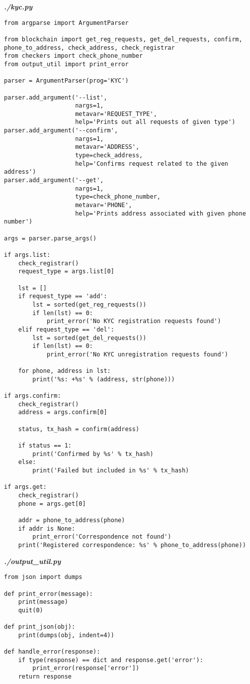 \textit{\textbf{./kyc.py}}
\begin{verbatim}
from argparse import ArgumentParser

from blockchain import get_reg_requests, get_del_requests, confirm, phone_to_address, check_address, check_registrar
from checkers import check_phone_number
from output_util import print_error

parser = ArgumentParser(prog='KYC')

parser.add_argument('--list',
                    nargs=1,
                    metavar='REQUEST_TYPE',
                    help='Prints out all requests of given type')
parser.add_argument('--confirm',
                    nargs=1,
                    metavar='ADDRESS',
                    type=check_address,
                    help='Confirms request related to the given address')
parser.add_argument('--get',
                    nargs=1,
                    type=check_phone_number,
                    metavar='PHONE',
                    help='Prints address associated with given phone number')

args = parser.parse_args()

if args.list:
    check_registrar()
    request_type = args.list[0]

    lst = []
    if request_type == 'add':
        lst = sorted(get_reg_requests())
        if len(lst) == 0:
            print_error('No KYC registration requests found')
    elif request_type == 'del':
        lst = sorted(get_del_requests())
        if len(lst) == 0:
            print_error('No KYC unregistration requests found')

    for phone, address in lst:
        print('%s: +%s' % (address, str(phone)))

if args.confirm:
    check_registrar()
    address = args.confirm[0]

    status, tx_hash = confirm(address)

    if status == 1:
        print('Confirmed by %s' % tx_hash)
    else:
        print('Failed but included in %s' % tx_hash)

if args.get:
    check_registrar()
    phone = args.get[0]

    addr = phone_to_address(phone)
    if addr is None:
        print_error('Correspondence not found')
    print('Registered correspondence: %s' % phone_to_address(phone))
\end{verbatim}

\textit{\textbf{./output\_util.py}}
\begin{verbatim}
from json import dumps

def print_error(message):
    print(message)
    quit(0)

def print_json(obj):
    print(dumps(obj, indent=4))

def handle_error(response):
    if type(response) == dict and response.get('error'):
        print_error(response['error'])
    return response
\end{verbatim}

